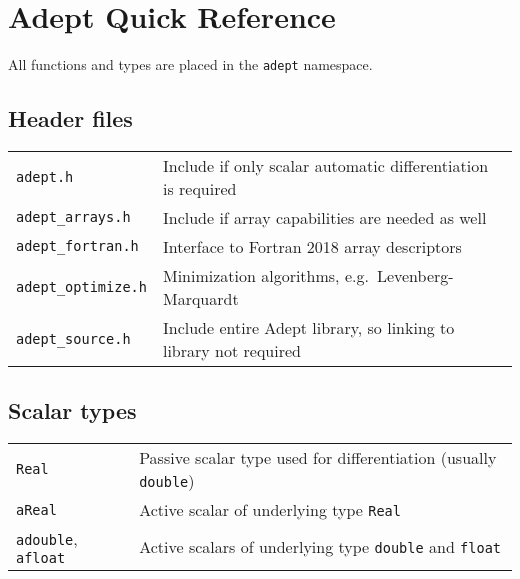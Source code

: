 \documentclass[10pt,a4,landscape]{article}
\def\myfont{\fontfamily{cmss}\selectfont}
\def\mysize{\footnotesize}
\def\mysize{\small}
\def\code#1{\texttt{#1}}
\begin{document}
\pagestyle{empty}
\twocolumn
\mysize\myfont\section*{\Huge Adept Quick Reference}
All functions and types are placed in the \code{adept} namespace.
\subsection*{Header files}
\begin{tabular}{ll}
\code{adept.h} & Include if only scalar automatic differentiation is required\\
\code{adept\_arrays.h} & Include if array capabilities are needed as well\\
\code{adept\_fortran.h} & Interface to Fortran 2018 array descriptors\\
\code{adept\_optimize.h} & Minimization algorithms, e.g.\ Levenberg-Marquardt\\
\code{adept\_source.h} & Include entire Adept library, so linking to library not required \\
\end{tabular}

\subsection*{Scalar types}
\begin{tabular}{ll}
\code{Real} & Passive scalar type used for differentiation (usually
\code{double})\\
\code{aReal} & Active scalar of underlying type \code{Real} \\
\code{adouble}, \code{afloat} & Active scalars of underlying type
\code{double} and \code{float}\\
\end{tabular}
\end{document}
